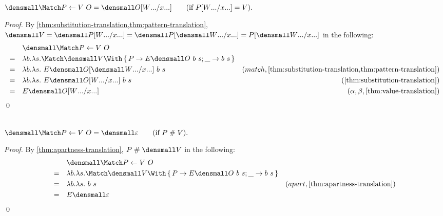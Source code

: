 \begin{lemma}
  \label{thm:try-match}
  \\
  $\den{\Match P \gets V ~ O} = \den{O\subst{\many{x}}{\many{W}}}
  \qquad (\text{if } P\subst{\many{x}}{\many{W}} = V).$
\end{lemma}
\begin{proof}
  By \cref{thm:substitution-translation,thm:pattern-translation},
  \begin{math}
    \den{V}
    =
    \den{P\subst{\many{x}}{\many{W}}}
    =
    \den{P}\subst{\many{x}}{\many{\den{W}}}
    =
    P\subst{\many{x}}{\many{\den{W}}}
  \end{math}
  in the following:
  \begin{align*}
    &\quad \den{\Match P \gets V ~ O}  \\
    =&\quad \lambda b. \lambda s. \Match \den{V} \With \set{P \to E\den{O}~b~s; \_ \to b~s} \\
    =&\quad  \lambda b. \lambda s.~E\den{O}\subst{\many{x}}{\many{\den{W}}}~b~s  & (match, \cref{thm:substitution-translation,thm:pattern-translation}) \\
    =& \quad \lambda b. \lambda s.~E\den{O\subst{\many{x}}{\many{W}}}~b~s & (\cref{thm:substitution-translation})
    \\
    =& \quad E\den{O\subst{\many{x}}{\many{W}}} & (\alpha, \beta, \cref{thm:value-translation})
  \end{align*}
  \qed
\end{proof}

\begin{lemma}
  \label{thm:try-match-apart}
  \\
  $\den{\Match P \gets V ~ O} = \den{\varepsilon}
  \qquad (\text{if } P \apart V).$
\end{lemma}
\begin{proof}
  By \cref{thm:apartness-translation}, $P \apart \den{V}$ in the following:
  \begin{align*}
    &\quad \den{\Match P \gets V ~ O}  \\
    =&\quad \lambda b. \lambda s. \Match \den{V} \With \set{P \to E\den{O}~b~s; \_ \to b~s} \\
    =&\quad  \lambda b. \lambda s.~b~s  & (apart, \cref{thm:apartness-translation}) \\
    =& \quad E\den{\varepsilon}
  \end{align*}
  \qed
\end{proof}

